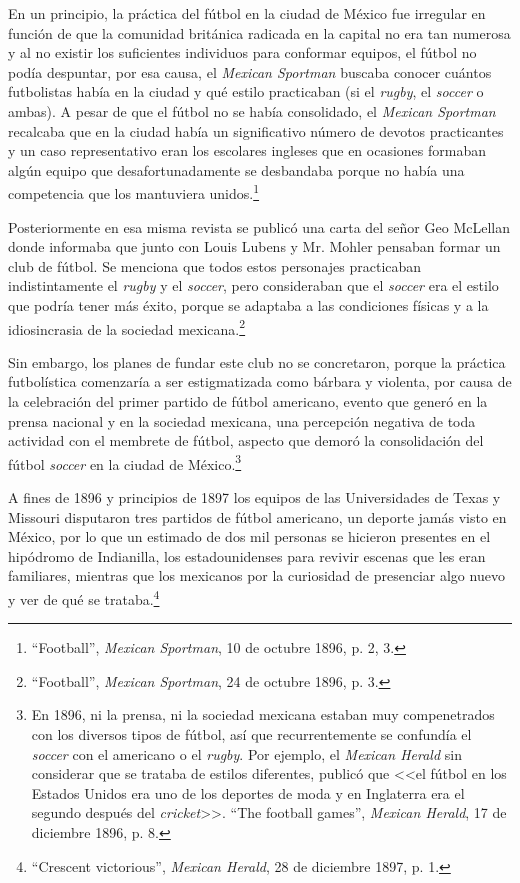 \documentclass[11pt,a5paper,twoside]{book} %
\begin{document}
En un principio, la práctica del fútbol en la ciudad de México fue irregular en función
de que la comunidad británica radicada en la capital no era tan numerosa y al no existir los
suficientes individuos para conformar equipos, el fútbol no podía despuntar, por esa causa,
el \emph{Mexican Sportman} buscaba conocer cuántos futbolistas había en la ciudad y qué estilo
practicaban (si el \emph{rugby}, el \emph{soccer} o ambas). A pesar de que el fútbol no se había consolidado,
el \emph{Mexican Sportman} recalcaba que en la ciudad había un significativo número de devotos
practicantes y un caso representativo eran los escolares ingleses que en ocasiones formaban
algún equipo que desafortunadamente se desbandaba porque no había una competencia que
los mantuviera unidos.\footnote{``Football'', \emph{Mexican Sportman}, 10 de octubre 1896, p. 2, 3.}

Posteriormente en esa misma revista se publicó una carta del señor Geo McLellan
donde informaba que junto con Louis Lubens y Mr. Mohler pensaban formar un club de
fútbol. Se menciona que todos estos personajes practicaban indistintamente el \emph{rugby} y el
\emph{soccer}, pero consideraban que el \emph{soccer} era el estilo que podría tener más éxito, porque se
adaptaba a las condiciones físicas y a la idiosincrasia de la sociedad mexicana.\footnote{``Football'', \emph{Mexican Sportman}, 24 de octubre 1896, p. 3.}

Sin embargo, los planes de fundar este club no se concretaron, porque la práctica
futbolística comenzaría a ser estigmatizada como bárbara y violenta, por causa de la
celebración del primer partido de fútbol americano, evento que generó en la prensa nacional y en la sociedad mexicana, una percepción negativa de toda actividad con el membrete de
fútbol, aspecto que demoró la consolidación del fútbol \emph{soccer} en la ciudad de México.\footnote{En 1896, ni la prensa, ni la sociedad mexicana estaban muy compenetrados con los diversos tipos de fútbol, así que recurrentemente se confundía el \emph{soccer} con el americano o el \emph{rugby}. Por ejemplo, el \emph{Mexican Herald} sin considerar que se trataba de estilos diferentes, publicó que <<el fútbol en los Estados Unidos era uno de los deportes de moda y en Inglaterra era el segundo después del \emph{cricket}>>. ``The football games'', \emph{Mexican Herald}, 17 de diciembre 1896, p. 8.}

A fines de 1896 y principios de 1897 los equipos de las Universidades de Texas y
Missouri disputaron tres partidos de fútbol americano, un deporte jamás visto en México, por
lo que un estimado de dos mil personas se hicieron presentes en el hipódromo de Indianilla,
los estadounidenses para revivir escenas que les eran familiares, mientras que los mexicanos
por la curiosidad de presenciar algo nuevo y ver de qué se trataba.\footnote{``Crescent victorious'', \emph{Mexican Herald}, 28 de diciembre 1897, p. 1.}
\end{document}
